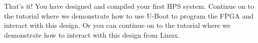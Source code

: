 \begin{flushleft}
\newpage

That's it! You have designed and compiled your first HPS system.  Continue on to the  tutorial where we demonstrate how to use U-Boot to program the FPGA and interact with this design.  Or you can continue on to the  tutorial where we demonstrate how to interact with this design from Linux.

\end{flushleft}



